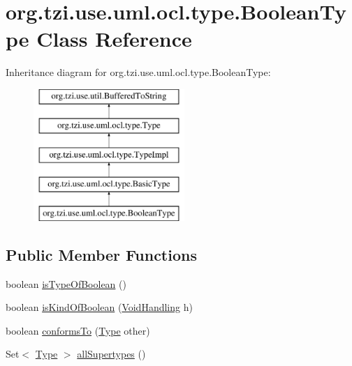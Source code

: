 \hypertarget{classorg_1_1tzi_1_1use_1_1uml_1_1ocl_1_1type_1_1_boolean_type}{\section{org.\-tzi.\-use.\-uml.\-ocl.\-type.\-Boolean\-Type Class Reference}
\label{classorg_1_1tzi_1_1use_1_1uml_1_1ocl_1_1type_1_1_boolean_type}
}
Inheritance diagram for org.\-tzi.\-use.\-uml.\-ocl.\-type.\-Boolean\-Type\-:\begin{figure}[H]
\begin{center}
\leavevmode
\includegraphics[height=5.000000cm]{classorg_1_1tzi_1_1use_1_1uml_1_1ocl_1_1type_1_1_boolean_type}
\end{center}
\end{figure}
\subsection*{Public Member Functions}
\begin{DoxyCompactItemize}
\item 
boolean \hyperlink{classorg_1_1tzi_1_1use_1_1uml_1_1ocl_1_1type_1_1_boolean_type_ad4b22efdfc52a2741dd23c4d34c82c54}{is\-Type\-Of\-Boolean} ()
\item 
boolean \hyperlink{classorg_1_1tzi_1_1use_1_1uml_1_1ocl_1_1type_1_1_boolean_type_a6c6d6bf2c9e3f5f64532fb9e04904f91}{is\-Kind\-Of\-Boolean} (\hyperlink{enumorg_1_1tzi_1_1use_1_1uml_1_1ocl_1_1type_1_1_type_1_1_void_handling}{Void\-Handling} h)
\item 
boolean \hyperlink{classorg_1_1tzi_1_1use_1_1uml_1_1ocl_1_1type_1_1_boolean_type_a85901d3487356f7f767626a6ada4fa32}{conforms\-To} (\hyperlink{interfaceorg_1_1tzi_1_1use_1_1uml_1_1ocl_1_1type_1_1_type}{Type} other)
\item 
Set$<$ \hyperlink{interfaceorg_1_1tzi_1_1use_1_1uml_1_1ocl_1_1type_1_1_type}{Type} $>$ \hyperlink{classorg_1_1tzi_1_1use_1_1uml_1_1ocl_1_1type_1_1_boolean_type_a7f59d076cfb0e03d167b16735f2f1d22}{all\-Supertypes} ()
\end{DoxyCompactItemize}

